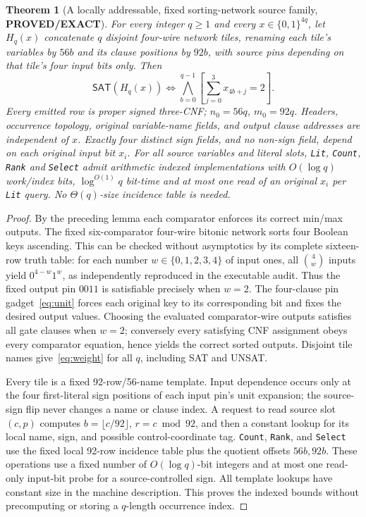 \documentclass[11pt]{article}
\newtheorem{theorem}{Theorem}
\newcommand{\SAT}{\mathsf{SAT}}
\begin{document}
\begin{theorem}[A locally addressable, fixed sorting-network source family, \textbf{PROVED/EXACT}]
For every integer $q\ge1$ and every $x\in\{0,1\}^{4q}$, let $H_q(x)$ concatenate $q$ disjoint four-wire network tiles, renaming each tile's variables by $56b$ and its clause positions by $92b$, with source pins depending on that tile's four input bits only. Then
\begin{equation}
\SAT(H_q(x))\iff\bigwedge_{b=0}^{q-1}\left[\sum_{j=0}^3x_{4b+j}=2\right].
\label{eq:weight}
\end{equation}
Every emitted row is proper signed three-CNF; $n_0=56q$, $m_0=92q$. Headers, occurrence topology, original variable-name fields, and output clause addresses are independent of $x$. Exactly four distinct sign fields, and no non-sign field, depend on each original input bit $x_i$. For all source variables and literal slots, \texttt{Lit}, \texttt{Count}, \texttt{Rank} and \texttt{Select} admit arithmetic indexed implementations with $O(\log q)$ work/index bits, $\log^{O(1)}q$ bit-time and at most one read of an original $x_i$ per \texttt{Lit} query. No $\Theta(q)$-size incidence table is needed.
\end{theorem}
\begin{proof}
By the preceding lemma each comparator enforces its correct min/max outputs. The fixed six-comparator four-wire bitonic network sorts four Boolean keys ascending. This can be checked without asymptotics by its complete sixteen-row truth table: for each number $w\in\{0,1,2,3,4\}$ of input ones, all $\binom4w$ inputs yield $0^{4-w}1^w$, as independently reproduced in the executable audit. Thus the fixed output pin $0011$ is satisfiable precisely when $w=2$. The four-clause pin gadget~\eqref{eq:unit} forces each original key to its corresponding bit and fixes the desired output values. Choosing the evaluated comparator-wire outputs satisfies all gate clauses when $w=2$; conversely every satisfying CNF assignment obeys every comparator equation, hence yields the correct sorted outputs. Disjoint tile names give~\eqref{eq:weight} for all $q$, including SAT and UNSAT.

Every tile is a fixed 92-row/56-name template. Input dependence occurs only at the four first-literal sign positions of each input pin's unit expansion; the source-sign flip never changes a name or clause index. A request to read source slot $(c,p)$ computes $b=\lfloor c/92\rfloor$, $r=c\bmod92$, and then a constant lookup for its local name, sign, and possible control-coordinate tag. \texttt{Count}, \texttt{Rank}, and \texttt{Select} use the fixed local 92-row incidence table plus the quotient offsets $56b,92b$. These operations use a fixed number of $O(\log q)$-bit integers and at most one read-only input-bit probe for a source-controlled sign. All template lookups have constant size in the machine description. This proves the indexed bounds without precomputing or storing a $q$-length occurrence index.
\end{proof}
\end{document}
